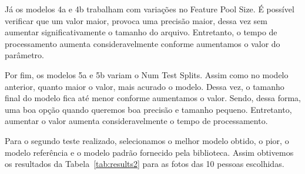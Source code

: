 \documentclass[twoside,conference,a4paper]{IEEEtran}
\begin{document}
Já os modelos 4a e 4b trabalham com variações no Feature Pool Size. É possível verificar que um valor maior, provoca uma precisão maior, dessa vez sem aumentar significativamente o tamanho do arquivo. Entretanto, o tempo de processamento aumenta consideravelmente conforme aumentamos o valor do parâmetro.

Por fim, os modelos 5a e 5b variam o Num Test Splits. Assim como no modelo anterior, quanto maior o valor, mais acurado o modelo. Dessa vez, o tamanho final do modelo fica até menor conforme aumentamos o valor. Sendo, dessa forma, uma boa opção quando queremos boa precisão e tamanho pequeno. Entretanto, aumentar o valor aumenta consideravelmente o tempo de processamento.

Para o segundo teste realizado, selecionamos o melhor modelo obtido, o pior, o modelo referência e o modelo padrão fornecido pela biblioteca. Assim obtivemos os resultados da Tabela~\ref{tab:results2} para as fotos das 10 pessoas escolhidas.
\end{document}
